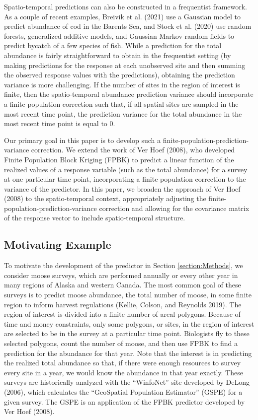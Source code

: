 \documentclass[smallextended]{svjour3}       %
\begin{document}
Spatio-temporal predictions can also be constructed in a frequentist
framework. As a couple of recent examples, Breivik et al. (2021) use a
Gaussian model to predict abundance of cod in the Barents Sea, and Stock
et al. (2020) use random forests, generalized additive models, and
Gaussian Markov random fields to predict bycatch of a few species of
fish. While a prediction for the total abundance is fairly
straightforward to obtain in the frequentist setting (by making
predictions for the response at each unobserved site and then summing
the observed response values with the predictions), obtaining the
prediction variance is more challenging. If the number of sites in the
region of interest is finite, then the spatio-temporal abundance
prediction variance should incorporate a finite population correction
such that, if all spatial sites are sampled in the most recent time
point, the prediction variance for the total abundance in the most
recent time point is equal to 0.

Our primary goal in this paper is to develop such a
finite-population-prediction-variance correction. We extend the work of
Ver Hoef (2008), who developed Finite Population Block Kriging (FPBK) to
predict a linear function of the realized values of a response variable
(such as the total abundance) for a survey at one particular time point,
incorporating a finite population correction to the variance of the
predictor. In this paper, we broaden the approach of Ver Hoef (2008) to
the spatio-temporal context, appropriately adjusting the
finite-population-prediction-variance correction and allowing for the
covariance matrix of the response vector to include spatio-temporal
structure.

\hypertarget{motivating-example}{%
\subsection{Motivating Example}\label{motivating-example}}

To motivate the development of the predictor in Section
\ref{section:Methods}, we consider moose surveys, which are performed
annually or every other year in many regions of Alaska and western
Canada. The most common goal of these surveys is to predict moose
abundance, the total number of moose, in some finite region to inform
harvest regulations (Kellie, Colson, and Reynolds 2019). The region of
interest is divided into a finite number of areal polygons. Because of
time and money constraints, only some polygons, or sites, in the region
of interest are selected to be in the survey at a particular time point.
Biologists fly to these selected polygons, count the number of moose,
and then use FPBK to find a prediction for the abundance for that year.
Note that the interest is in predicting the realized total abundance so
that, if there were enough resources to survey every site in a year, we
would know the abundance in that year exactly. These surveys are
historically analyzed with the ``WinfoNet'' site developed by DeLong
(2006), which calculates the ``GeoSpatial Population Estimator'' (GSPE)
for a given survey. The GSPE is an application of the FPBK predictor
developed by Ver Hoef (2008).
\end{document}
